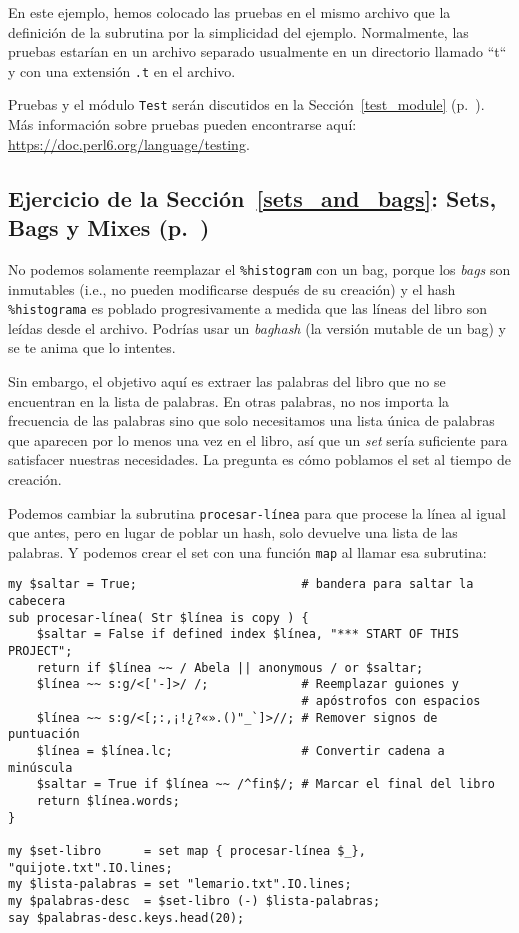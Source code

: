 En este ejemplo, hemos colocado las pruebas en el mismo archivo
que la definición de la subrutina por la simplicidad del ejemplo.
Normalmente, las pruebas estarían en un archivo separado usualmente
en un directorio llamado ``t``  y con una extensión \verb|.t| en el
archivo.

Pruebas y el módulo {\tt Test} serán discutidos en la Sección~\ref{test_module} (p.~\pageref{test_module}).
Más información sobre pruebas pueden encontrarse aquí:
\url{https://doc.perl6.org/language/testing}.

\subsection{Ejercicio de la Sección~\ref{sets_and_bags}: Sets, Bags y Mixes (p.~\pageref{diff_with_set})}
\label{sol_diff_with_set}

No podemos solamente reemplazar el \verb|%histogram| con un bag,
porque los \emph{bags} son inmutables (i.e., no pueden modificarse
después de su creación) y el hash \verb|%histograma| es poblado 
progresivamente a medida que las líneas del libro son leídas desde
el archivo. Podrías usar un \emph{baghash} (la versión mutable de
un bag) y se te anima que lo intentes.

Sin embargo, el objetivo aquí es extraer las palabras del libro
que no se encuentran en la lista de palabras. En otras palabras, 
no nos importa la frecuencia de las palabras sino que solo necesitamos
una lista única de palabras que aparecen por lo menos una vez en el
libro, así que un \emph{set} sería suficiente para satisfacer nuestras
necesidades. La pregunta es cómo poblamos el set al tiempo de creación.

Podemos cambiar la subrutina {\tt procesar-línea} para que 
procese la línea al igual que antes, pero en lugar de poblar un
hash, solo devuelve una lista de las palabras. Y podemos crear el
set con una función {\tt map} al llamar esa subrutina:

\begin{verbatim}
my $saltar = True;                       # bandera para saltar la cabecera
sub procesar-línea( Str $línea is copy ) {
    $saltar = False if defined index $línea, "*** START OF THIS PROJECT";
    return if $línea ~~ / Abela || anonymous / or $saltar; 
    $línea ~~ s:g/<['-]>/ /;             # Reemplazar guiones y 
                                         # apóstrofos con espacios
    $línea ~~ s:g/<[;:,¡!¿?«».()"_`]>//; # Remover signos de puntuación
    $línea = $línea.lc;                  # Convertir cadena a minúscula
    $saltar = True if $línea ~~ /^fin$/; # Marcar el final del libro
    return $línea.words;
}

my $set-libro      = set map { procesar-línea $_}, "quijote.txt".IO.lines; 
my $lista-palabras = set "lemario.txt".IO.lines;
my $palabras-desc  = $set-libro (-) $lista-palabras;
say $palabras-desc.keys.head(20);
\end{verbatim}

